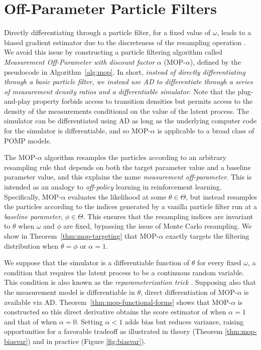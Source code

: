 \documentclass[11pt]{article}
\begin{document}


\section{Off-Parameter Particle Filters}

Directly differentiating through a particle filter, for a fixed value of $\omega$, leads to a biased gradient estimator due to the discreteness of the resampling operation \cite{corenflos21}.
We avoid this issue by constructing a particle filtering algorithm called {\it Measurement Off-Parameter with discount factor} $\alpha$ (MOP-$\alpha$), defined by the pseudocode in Algorithm~\ref{alg:mop}.
In short, \textit{instead of directly differentiating through a basic particle filter, we instead use AD to differentiate through a series of measurement density ratios and a differentiable simulator}.
Note that the plug-and-play property forbids access to transition densities but permits access to the density of the measurements conditional on the value of the latent process.
The simulator can be differentiated using AD as long as the underlying computer code for the simulator is differentiable, and so MOP-$\alpha$ is applicable to a broad class of POMP models.

The MOP-$\alpha$ algorithm resamples the particles according to an arbitrary resampling rule that depends on both the target parameter value and a baseline parameter value, and this explains the name {\it measurement off-parameter}.
This is intended as an analogy to {\it off-policy} learning in reinforcement learning.
Specifically, MOP-$\alpha$ evaluates the likelihood at some $\theta \in \Theta$, but instead resamples the particles according to the indices generated by a vanilla particle filter run at a {\it baseline parameter}, $\phi \in \Theta$.
This ensures that the resampling indices are invariant to $\theta$ when $\omega$ and $\phi$ are fixed, bypassing the issue of Monte Carlo resampling.
We show in Theorem~\ref{thm:mop-targeting} that MOP-$\alpha$ exactly targets the filtering distribution when $\theta=\phi$ or $\alpha=1$.

We suppose that the simulator is a differentiable function of $\theta$ for every fixed $\omega$, a condition that requires the latent process to be a continuous random variable. 
This condition is also known as the {\it reparameterization trick} \cite{corenflos21}.
Supposing also that the measurement model is differentiable in $\theta$, direct differentiation of MOP-$\alpha$ is available via AD.
Theorem~\ref{thm:mop-functional-forms} shows that MOP-$\alpha$ is constructed so this direct derivative obtains the score estimator of  \cite{poyiadjis11, scibior21} when $\alpha=1$ and that of \cite{naesseth18} when $\alpha=0$.
Setting $\alpha<1$ adds bias but reduces variance, raising opportunities for a favorable tradeoff as illustrated in theory (Theorem \ref{thm:mop-biasvar}) and in practice (Figure \ref{fig:biasvar}).
\end{document}
